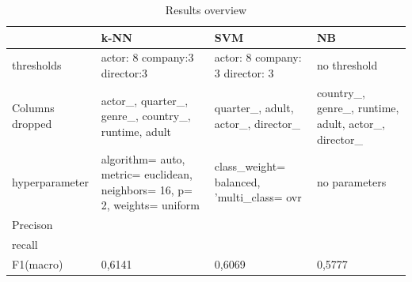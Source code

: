 
\begin{center}
\begin{table}
	\begin{tabular}{ | p{} | p{} | p{2.5cm} | p{3cm}|}
    \hline
    & k-NN & SVM & NB\\ \hline
	thresholds & actor: 8 company:3 director:3 & actor: 8 company: 3 director: 3 & no threshold \\  \hline
    Columns dropped & actor\_, quarter\_, genre\_, country\_, runtime, adult & quarter\_, adult, actor\_, director\_ & country\_, genre\_, runtime, adult, actor\_, director\_  \\ \hline
    hyperparameter & algorithm= auto, metric= euclidean, neighbors= 16, p= 2, weights= uniform & class\_weight= balanced, 'multi\_class= ovr & no parameters  \\ \hline
    Precison&  &  &  \\ \hline
	recall &  &  &   \\ \hline
	F1(macro) & 0,6141 & 0,6069 & 0,5777 \\ \hline
    
    \end{tabular}
    \caption{Results overview} 
   \label{tab:values}
\end{table}
\end{center}
